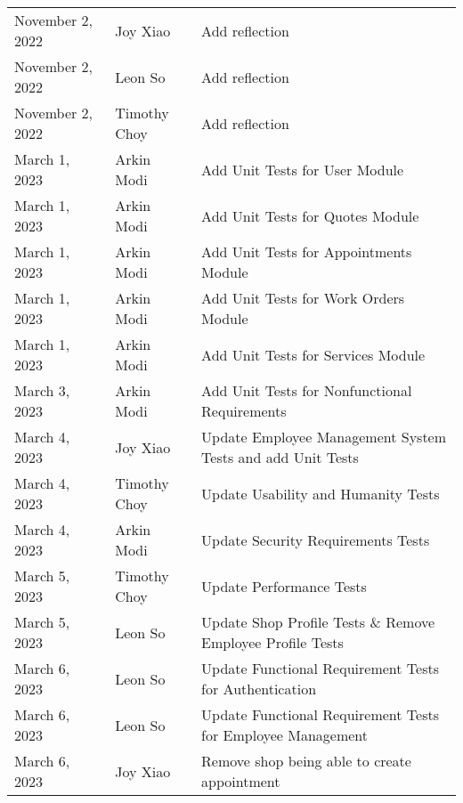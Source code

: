 \documentclass[12pt, titlepage]{article}
\begin{document}
\begin{longtable}{p{} p{} p{}}
	November 2, 2022 & Joy Xiao              & Add reflection                                              \\
	November 2, 2022 & Leon So               & Add reflection                                              \\
	November 2, 2022 & Timothy Choy          & Add reflection                                              \\
	March 1, 2023    & Arkin Modi            & Add Unit Tests for User Module                              \\
	March 1, 2023    & Arkin Modi            & Add Unit Tests for Quotes Module                            \\
	March 1, 2023    & Arkin Modi            & Add Unit Tests for Appointments Module                      \\
	March 1, 2023    & Arkin Modi            & Add Unit Tests for Work Orders Module                       \\
	March 1, 2023    & Arkin Modi            & Add Unit Tests for Services Module                          \\
	March 3, 2023    & Arkin Modi            & Add Unit Tests for Nonfunctional Requirements               \\
	March 4, 2023    & Joy Xiao              & Update Employee Management System Tests and add Unit Tests  \\
	March 4, 2023    & Timothy Choy          & Update Usability and Humanity Tests                         \\
	March 4, 2023    & Arkin Modi            & Update Security Requirements Tests                          \\
	March 5, 2023    & Timothy Choy          & Update Performance Tests                                    \\
	March 5, 2023    & Leon So               & Update Shop Profile Tests \& Remove Employee Profile Tests  \\
	March 6, 2023    & Leon So               & Update Functional Requirement Tests for Authentication      \\
	March 6, 2023    & Leon So               & Update Functional Requirement Tests for Employee Management \\
	March 6, 2023    & Joy Xiao              & Remove shop being able to create appointment                \\
	\bottomrule
\end{longtable}
\end{document}
